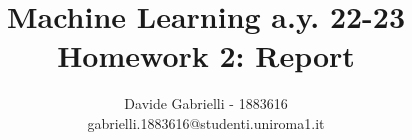 \documentclass{article}
\title{Machine Learning a.y. 22-23\\ \textbf{Homework 2: Report}}
\author{
Davide Gabrielli - 1883616\\
gabrielli.1883616@studenti.uniroma1.it
}
\begin{document}
\maketitle

\sloppy


%
\end{document}
